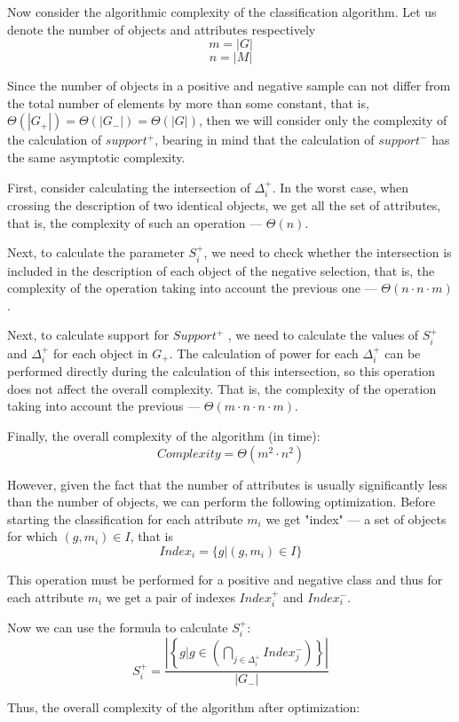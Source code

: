 \documentclass{article}
\begin{document}
Now consider the algorithmic complexity of the classification algorithm. Let us denote the number of objects and attributes respectively
$$m = |G|$$
$$n = |M|$$

Since the number of objects in a positive and negative sample can not differ from the total number of elements by more than some constant, that is, $\Theta(|G_+|) = \Theta (|G_-|) = \Theta (|G|)$, then we will consider only the complexity of the calculation of $support^+$, bearing in mind that the calculation of $support^-$ has the same asymptotic complexity.

First, consider calculating the intersection of $\Delta^+_i$. In the worst case, when crossing the description of two identical objects, we get all the set of attributes, that is, the complexity of such an operation --- $\Theta(n)$.

Next, to calculate the parameter $S_i^+$, we need to check whether the intersection is included in the description of each object of the negative selection, that is, the complexity of the operation taking into account the previous one --- $\Theta(n \cdot n \cdot m)$.

Next, to calculate support for $Support^+$ , we need to calculate the values of $S_i^+$ and $\Delta_i^+$ for each object in $G_+$. The calculation of power for each $\Delta_i^+$ can be performed directly during the calculation of this intersection, so this operation does not affect the overall complexity. That is, the complexity of the operation taking into account the previous --- $\Theta (m \cdot n \cdot n \cdot m)$.

Finally, the overall complexity of the algorithm (in time):
$$Complexity = \Theta(m^2 \cdot n^2)$$

However, given the fact that the number of attributes is usually significantly less than the number of objects, we can perform the following optimization. Before starting the classification for each attribute $m_i$ we get "index" --- a set of objects for which $(g, m_i) \in I$, that is
$$Index_i = \{g| (g, m_i) \in I\}$$

This operation must be performed for a positive and negative class and thus for each attribute $m_i$ we get a pair of indexes $Index_i^+$ and $Index_i^-$.

Now we can use the formula to calculate $S_i^+$:
$$S_i^+ = \frac{\left\vert \left\{g|g \in \left(\bigcap_{j\in \Delta_i^+} Index_j^- \right) \right\} \right\vert}{|G_-|}$$

Thus, the overall complexity of the algorithm after optimization:
\end{document}
